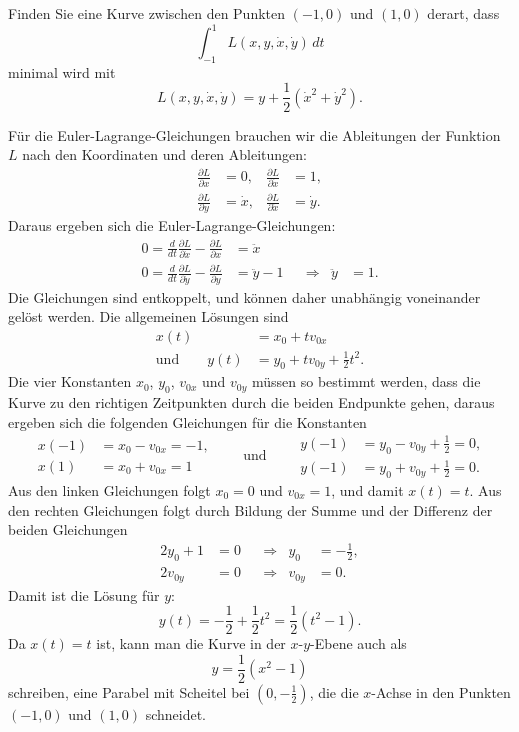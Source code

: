 Finden Sie eine Kurve zwischen den Punkten $(-1,0)$ und $(1,0)$
derart, dass 
\[
\int_{-1}^1 L(x,y,\dot x, \dot y)\,dt
\]
minimal wird mit
\[
L(x,y,\dot x, \dot y)
=
y+\frac12(\dot x^2+\dot y^2).
\]

\begin{loesung}
Für die Euler-Lagrange-Gleichungen brauchen wir die Ableitungen der
Funktion $L$ nach den Koordinaten und deren Ableitungen:
\begin{equation}
\begin{aligned}
\frac{\partial L}{\partial x}
&=
0,
&
\frac{\partial L}{\partial \dot x}
&=
1,
\\
\frac{\partial L}{\partial y}
&=
\dot x,
&
\frac{\partial L}{\partial \dot x}
&=
\dot y.
\end{aligned}
\end{equation}
Daraus ergeben sich die Euler-Lagrange-Gleichungen:
\[
\begin{aligned}
0=
\frac{d}{dt}
\frac{\partial L}{\partial\dot x}
-
\frac{\partial L}{\partial x}
&=
\ddot x
\\
0=
\frac{d}{dt}
\frac{\partial L}{\partial\dot y}
-
\frac{\partial L}{\partial y}
&=
\ddot y-1
&&\Rightarrow&
\ddot y &= 1.
\end{aligned}
\]
Die Gleichungen sind entkoppelt, und können daher unabhängig voneinander
gelöst werden.
Die allgemeinen Lösungen sind
\[
\begin{aligned}
x(t)&=x_0 + t v_{0x}
\\
\text{und}\qquad
y(t)&=y_0 + t v_{0y} + \frac12t^2.
\end{aligned}
\]
Die vier Konstanten $x_0$, $y_0$, $v_{0x}$ und $v_{0y}$ müssen so bestimmt
werden, dass die Kurve zu den richtigen Zeitpunkten durch die 
beiden Endpunkte gehen, daraus ergeben sich die folgenden Gleichungen
für die Konstanten
\[
\begin{aligned}
x(-1)&=x_0-v_{0x}=-1,
\\
x(1)&=x_0+v_{0x}=1
\end{aligned}
\qquad
\text{und}
\qquad
\begin{aligned}
y(-1)&=y_0-v_{0y}+{\textstyle \frac12}=0,
\\
y(-1)&=y_0+v_{0y}+{\textstyle \frac12}=0.
\end{aligned}
\]
Aus den linken Gleichungen folgt $x_0=0$ und $v_{0x}=1$, und
damit $x(t)=t$.
Aus den rechten Gleichungen folgt durch Bildung der Summe und der
Differenz der beiden Gleichungen
\[
\begin{aligned}
2y_0+1&=0&&\Rightarrow& y_0&=-\frac12,\\
2v_{0y}&=0&&\Rightarrow& v_{0y}&=0.
\end{aligned}
\]
Damit ist die Lösung für $y$:
\[
y(t) = -\frac12+\frac12t^2=\frac12(t^2-1).
\]
Da $x(t)=t$ ist, kann man die Kurve in der $x$-$y$-Ebene auch als 
\[
y=\frac12(x^2-1)
\]
schreiben, eine Parabel mit Scheitel bei $(0,-\frac12)$, die die
$x$-Achse in den Punkten $(-1,0)$ und $(1,0)$ schneidet.
\end{loesung}

